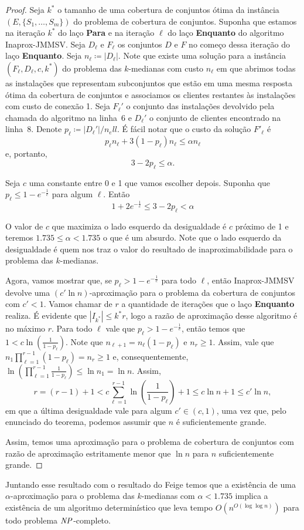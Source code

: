 \begin{proof}
Seja $k^*$ o tamanho de uma cobertura de conjuntos ótima da instância $(E,\{S_1,\ldots,S_m\})$ do problema de cobertura de conjuntos. Suponha que estamos na iteração $k^*$ do laço {\bf Para} e na iteração $\ell$ do laço {\bf Enquanto} do algoritmo {\sc Inaprox-JMMSV}.
Seja $D_\ell$ e $F_\ell$ os conjuntos $D$ e $F$ no começo dessa iteração do laço {\bf Enquanto}. Seja $n_\ell \coloneqq |D_\ell|$. Note que existe uma solução para a instância $(F_\ell,D_\ell,c,k^*)$ do problema das $k$-medianas com custo $n_\ell$ em que abrimos todas as instalações que representam subconjuntos que estão em uma mesma resposta ótima da cobertura de conjuntos e associamos os clientes restantes às instalações com custo de conexão 1.
Seja $F_\ell'$ o conjunto das instalações devolvido pela chamada do algoritmo na linha~6 e $D_\ell'$ o conjunto de clientes encontrado na linha~8. Denote $p_\ell \coloneqq  |D_\ell'|/n_ell$. É fácil notar que o custo da solução $F'_\ell$ é
\[ p_\ell n_\ell + 3 (1-p_\ell) n_\ell \leq \alpha  n_\ell\]
e, portanto, 
\[
3 - 2p_\ell \leq \alpha.
\]

Seja $c$ uma constante entre 0 e 1 que vamos escolher depois. Suponha que ${p_\ell \leq 1 - e^{-\frac{1}{c}}}$ para algum $\ell$. 
Então
\[ 1 + 2e^{-\frac{1}{c}} \leq 3 - 2p_\ell < \alpha\]

O valor de $c$ que maximiza o lado esquerdo da desigualdade é $c$ próximo de 1 e teremos $1.735 \leq \alpha < 1.735$ o que é um absurdo. Note que o lado esquerdo da desigualdade é quem nos traz o valor do resultado de inaproximabilidade para o problema das $k$-medianas.

Agora, vamos mostrar que, se $p_\ell > 1 - e^{ - \frac{1}{c}}$ para todo $\ell$, então {\sc Inaprox-JMMSV} devolve uma $(c'\ln n)$-aproximação para o problema da cobertura de conjuntos com $c' < 1$. Vamos chamar de $r$ a quantidade de iterações que o laço {\bf Enquanto} realiza. É evidente que $|I_{k^*}| \leq k^*r$, logo a razão de aproximação desse algoritmo é no máximo $r$. Para todo $\ell$ vale que $p_\ell > 1 - e^{ - \frac{1}{c}}$, então temos que $1 < c \ln\left( \frac{1}{1-p_\ell}\right)$. Note que $n_{\ell + 1} = n_\ell(1-p_\ell)$ e $n_r \geq 1$. Assim, vale que $n_1 \prod_{\ell =1}^{r-1} (1 - p_\ell) = n_r \geq 1$ e, consequentemente, $\ln\left(\prod_{\ell =1 }^{r-1} \frac{1}{1-p_\ell}\right) \leq \ln n_1 = \ln n$. Assim,
\[ r = (r - 1) + 1 < c\sum_{\ell = 1}^{r-1} \ln \left( \frac{1}{1-p_\ell}\right) + 1 \leq c \ln n + 1 \leq c' \ln n, \]
em que a última desigualdade vale para algum $c' \in (c,1)$, uma vez que, pelo enunciado do teorema, podemos assumir que $n$ é suficientemente grande.

Assim, temos uma aproximação para o problema de cobertura de conjuntos com razão de aproximação estritamente menor que $\ln n$ para $n$ suficientemente grande.
\end{proof}

Juntando esse resultado com o resultado do Feige temos que a existência de uma $\alpha$-aproximação para o problema das $k$-medianas com $\alpha < 1.735$ implica a existência de um algoritmo determinístico que leva tempo $O(n^{O(\log \log n)})$ para todo problema $\mathit{NP}$-completo.
